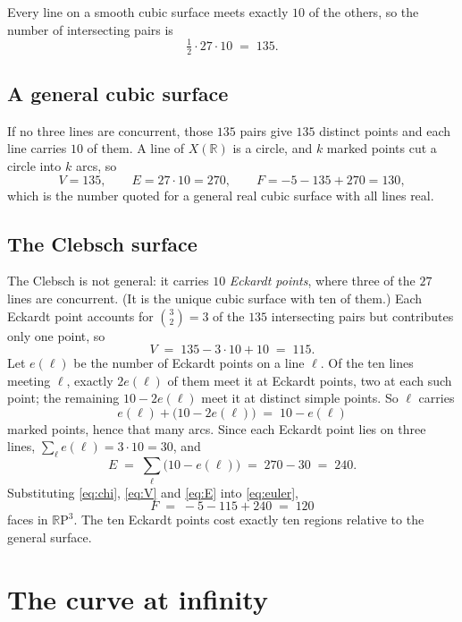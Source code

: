 \documentclass[11pt]{article}
\newcommand{\RP}{\mathbb{R}\mathrm{P}}
\newcommand{\R}{\mathbb{R}}
\begin{document}
Every line on a smooth cubic surface meets exactly $10$ of the others, so the
number of intersecting pairs is
\[
  \tfrac{1}{2}\cdot 27\cdot 10 \;=\; 135 .
\]

\subsection*{A general cubic surface}

If no three lines are concurrent, those $135$ pairs give $135$ distinct points and
each line carries $10$ of them. A line of $X(\R)$ is a circle, and $k$ marked
points cut a circle into $k$ arcs, so
\[
  V=135,\qquad E=27\cdot 10=270,\qquad F=-5-135+270=\boxed{130},
\]
which is the number quoted for a general real cubic surface with all lines real.

\subsection*{The Clebsch surface}

The Clebsch is not general: it carries $10$ \emph{Eckardt points}, where three of
the $27$ lines are concurrent. (It is the unique cubic surface with ten of them.)
Each Eckardt point accounts for $\binom{3}{2}=3$ of the $135$ intersecting pairs
but contributes only one point, so
\begin{equation}\label{eq:V}
  V \;=\; 135-3\cdot 10+10 \;=\; 115 .
\end{equation}
Let $e(\ell)$ be the number of Eckardt points on a line $\ell$. Of the ten lines
meeting $\ell$, exactly $2e(\ell)$ of them meet it at Eckardt points, two at each
such point; the remaining $10-2e(\ell)$ meet it at distinct simple points. So
$\ell$ carries
\[
  e(\ell)+\bigl(10-2e(\ell)\bigr) \;=\; 10-e(\ell)
\]
marked points, hence that many arcs. Since each Eckardt point lies on three lines,
$\sum_\ell e(\ell)=3\cdot 10=30$, and
\begin{equation}\label{eq:E}
  E \;=\; \sum_{\ell}\bigl(10-e(\ell)\bigr) \;=\; 270-30 \;=\; 240 .
\end{equation}
Substituting \eqref{eq:chi}, \eqref{eq:V} and \eqref{eq:E} into \eqref{eq:euler},
\[
  F \;=\; -5-115+240 \;=\; \boxed{120}
\]
faces in $\RP^3$. The ten Eckardt points cost exactly ten regions relative to the
general surface.

\section{The curve at infinity}
\end{document}
